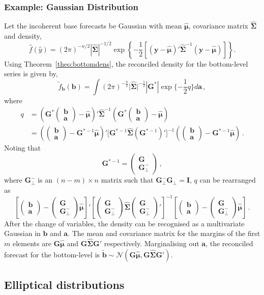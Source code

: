\documentclass[12pt]{article}
\def\PQ{\begin{pmatrix}\bm{G}\\[-0.2cm]\bm{G}_{\perp}^-\end{pmatrix}}
\def\bt{\begin{pmatrix}{\bm{b}}\\[-0.2cm]{\bm{a}}\end{pmatrix}}
\theoremstyle{definition}
\begin{document}
\subsubsection*{Example: Gaussian Distribution}

Let the incoherent base forecasts be Gaussian with mean $\hat{\bm{\mu}}$, covariance matrix $\hat{\bm{\Sigma}}$ and density,
\begin{equation}
\hat{f}(\hat{y})=(2\pi)^{-n/2}|\hat{\bm{\Sigma}}|^{-1/2}\exp\left\{-\frac{1}{2}\left[({\bm{y}}-\hat{\bm{\mu}})'\hat{\bm{\Sigma}}^{-1}({\bm{y}}-\hat{\bm{\mu}})\right]\right\}\nonumber.
\end{equation}
Using Theorem~\ref{theo:bottomdens}, the reconciled density for the bottom-level series is given by,
\begin{equation}
\tilde{f}_{\bm{b}}(\bm{b})=\int(2\pi)^{-\frac{n}{2}}\Big|\hat{\bm{\Sigma}}\Big|^{-\frac{1}{2}}|\bm{G^*}|\exp\{-\frac{1}{2}q\}d{\bm a}\nonumber\,,
\end{equation}
where
\begin{align*}
	q& =
	\left(\bm{G}^*\bt-\hat{\bm{\mu}}\right)' \hat{\bm{\Sigma}}^{-1}\left(\bm{G}^*\bt-\hat{\bm{\mu}}\right)\\
	& =
	\left(\bt-\bm{G}^{*-1}\hat{\bm{\mu}}\right)' \Big[\bm{G}^{*-1}\hat{\bm{\Sigma}}\left(\bm{G}^{*-1}\right)'\Big]^{-1}
	\left(\bt-\bm{G}^{*-1}\hat{\bm{\mu}}\right)\,.
\end{align*}
Noting that
\[
\bm{G}^{*-1}=\begin{pmatrix}
\bm{G} \\\bm{G}_{\perp}^-
\end{pmatrix}\,,
\]
where $\bm{G}_{\perp}^-$ is an $(n-m)\times n$ matrix such that $\bm{G}_{\perp}^-\bm{G}_{\perp}=\bm{I}$, $q$ can be rearranged as
\[
 \left[\bt-\PQ\hat{\bm{\mu}}\right]' \left[\PQ\hat{\bm{\Sigma}}\PQ'\right]^{-1}\left[\bt-\PQ\hat{\bm{\mu}}\right]\,.
\]
After the change of variables, the density can be recognised as a multivariate Gaussian in $\bm{b}$ and $\bm{a}$.  The mean and covariance matrix for the margins of the first $m$ elements are $\bm{G}\hat{\bm{\mu}}$ and $\bm{G}\hat{\bm{\Sigma}}\bm{G}'$ respectively.  Marginalising out $\bm {a}$, the reconciled forecast for the bottom-level is $\tilde{\bm{b}} \sim \mathcal{N}(\bm{G}\hat{\bm{\mu}}, \bm{G}\hat{\bm{\Sigma}}\bm{G}')$.

\subsection{Elliptical distributions}
\end{document}
